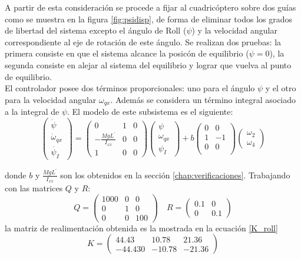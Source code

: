 \documentclass[main]{subfiles}
\begin{document}
A partir de esta consideraci\'on se procede a fijar al cuadric\'optero sobre dos gu\'ias como se muestra en la figura \ref{fig:psidisp}, de forma de eliminar todos los grados de libertad del sistema excepto el \'angulo de Roll ($\psi$) y la velocidad angular correspondiente al eje de rotaci\'on de este ángulo. Se realizan dos pruebas: la primera consiste en que el sistema alcance la posic\'on de equilibrio ($\psi = 0$), la segunda consiste en alejar al sistema del equilibrio y lograr que vuelva al punto de equilibrio.\\

El controlador posee dos términos proporcionales: uno para el \'angulo $\psi$ y el otro para la velocidad angular $\omega_{qx}$. Además se considera un t\'ermino integral asociado a la integral de $\psi$. El modelo de este subsistema es el siguiente:
\begin{equation}
\left(\begin{array}{c}
\dot{\psi}\\
\dot{\omega}_{qx}\\
\dot{\psi_I}
\end{array}\right) = \left(\begin{array}{ccc}
0 & 1 & 0\\
-\frac{MgL^\prime}{I_{xx}} & 0 & 0\\
1 & 0 &0
\end{array}\right) 
\left(\begin{array}{c}
{\psi}\\
{\omega}_{qx}\\
{\psi_I}
\end{array}\right)
+ b\left(\begin{array}{cc}
0 & 0\\
1 & -1\\
0 & 0\\
\end{array}\right) \left(\begin{array}{c}
\omega_2 \\
\omega_4
\end{array}\right)
\end{equation}

donde $b$ y $\frac{MgL^\prime}{I_{xx}}$ son los obtenidos en la secci\'on \ref{chap:verificaciones}. Trabajando con las matrices $Q$ y $R$:
\begin{equation}
\label{eq:Q_R_roll}
Q = \left(\begin{array}{ccc}
1000 & 0 & 0\\
0 & 1 & 0\\
0 & 0 & 100 
\end{array} \right) \quad R =\left(\begin{array}{cc}
0.1 & 0 \\
0 & 0.1
\end{array}\right)
\end{equation}
la matriz de realimentaci\'on obtenida es la mostrada en la ecuación \ref{K_roll}
\begin{equation}
\label{K_roll}
K = \left( \begin{array}{ccc}
44.43 & 10.78 &21.36\\
-44.430 & -10.78 &-21.36
\end{array}\right)
\end{equation}
\end{document}
